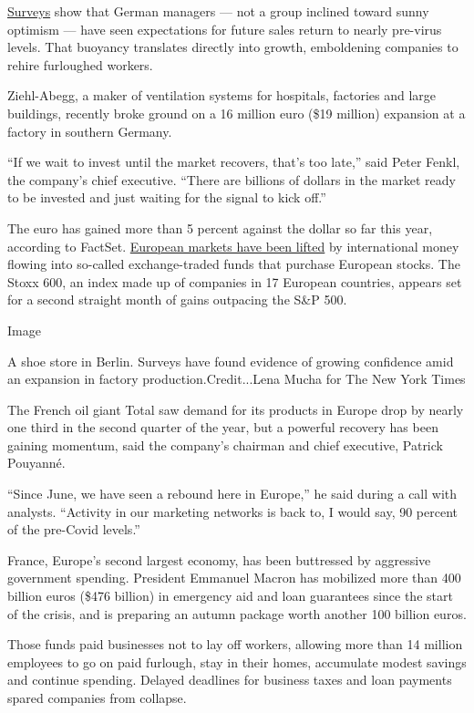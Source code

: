 \href{https://www.nytimes3xbfgragh.onion/2020/07/27/business/the-german-economy-shows-signs-of-rebounding.html}{Surveys}
show that German managers --- not a group inclined toward sunny optimism
--- have seen expectations for future sales return to nearly pre-virus
levels. That buoyancy translates directly into growth, emboldening
companies to rehire furloughed workers.

Ziehl-Abegg, a maker of ventilation systems for hospitals, factories and
large buildings, recently broke ground on a 16 million euro (\$19
million) expansion at a factory in southern Germany.

``If we wait to invest until the market recovers, that's too late,''
said Peter Fenkl, the company's chief executive. ``There are billions of
dollars in the market ready to be invested and just waiting for the
signal to kick off.''

The euro has gained more than 5 percent against the dollar so far this
year, according to FactSet.
\href{https://www.nytimes3xbfgragh.onion/2020/07/30/business/europes-markets-are-having-a-moment.html}{European
markets have been lifted} by international money flowing into so-called
exchange-traded funds that purchase European stocks. The Stoxx 600, an
index made up of companies in 17 European countries, appears set for a
second straight month of gains outpacing the S\&P 500.

Image

A shoe store in Berlin. Surveys have found evidence of growing
confidence amid an expansion in factory production.Credit...Lena Mucha
for The New York Times

The French oil giant Total saw demand for its products in Europe drop by
nearly one third in the second quarter of the year, but a powerful
recovery has been gaining momentum, said the company's chairman and
chief executive, Patrick Pouyanné.

``Since June, we have seen a rebound here in Europe,'' he said during a
call with analysts. ``Activity in our marketing networks is back to, I
would say, 90 percent of the pre-Covid levels.''

France, Europe's second largest economy, has been buttressed by
aggressive government spending. President Emmanuel Macron has mobilized
more than 400 billion euros (\$476 billion) in emergency aid and loan
guarantees since the start of the crisis, and is preparing an autumn
package worth another 100 billion euros.

Those funds paid businesses not to lay off workers, allowing more than
14 million employees to go on paid furlough, stay in their homes,
accumulate modest savings and continue spending. Delayed deadlines for
business taxes and loan payments spared companies from collapse.

